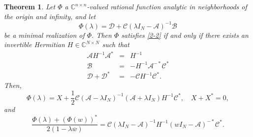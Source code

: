 \documentclass[12pt]{amsart}
\newtheorem{thm}{Theorem}[section]
\theoremstyle{definition}
\theoremstyle{remark}
\numberwithin{equation}{section}
\begin{document}
      \begin{thm}
        Let $\Phi$ a $\mathbb C^{n\times n}$-valued rational function analytic in neighborhoods of the origin and infinity, and let
        \[
          \Phi({\lambda})={\mathscr D}+{\mathscr C}({\lambda}I_N-{\mathscr A})^{-1}{\mathscr B}
        \]
        be a minimal realization of $\Phi$. Then $\Phi$
        satisfies \eqref{2-2} if and only if there exists an invertible Hermitian $H\in\mathbb C^{N\times N}$ such that
        \begin{eqnarray}
          \label{45}
          {\mathscr A}H^{-1}{\mathscr A}^*&=&H^{-1}\\
          {\mathscr B}&=&-H^{-1}{\mathscr A}^{-*}{\mathscr C^*}\\
          {\mathscr D}+{\mathscr D}^*&=&-{\mathscr C}H^{-1}{\mathscr C^*}.
                                         \label{47}
        \end{eqnarray}
        Then,
        \begin{equation}
          \label{59}
          \Phi({\lambda})=X+\frac{1}{2}{\mathscr C}(\mathscr A-{\lambda}I_N)^{-1}(\mathscr A+{\lambda}I_N)H^{-1}{\mathscr C^*},\quad X+X^*=0,
        \end{equation}
        and
        \begin{equation}
          \frac{\Phi({\lambda})+(\Phi(w))^*}{2(1-{\lambda}\overline{w})}={\mathscr C}({\lambda}I_N-{\mathscr A})^{-1}H^{-1}(wI_N-{\mathscr A})^{-*}{\mathscr C^*}.
          \label{58}
        \end{equation}
        \label{real-0987}
        \end{thm}
\end{document}
